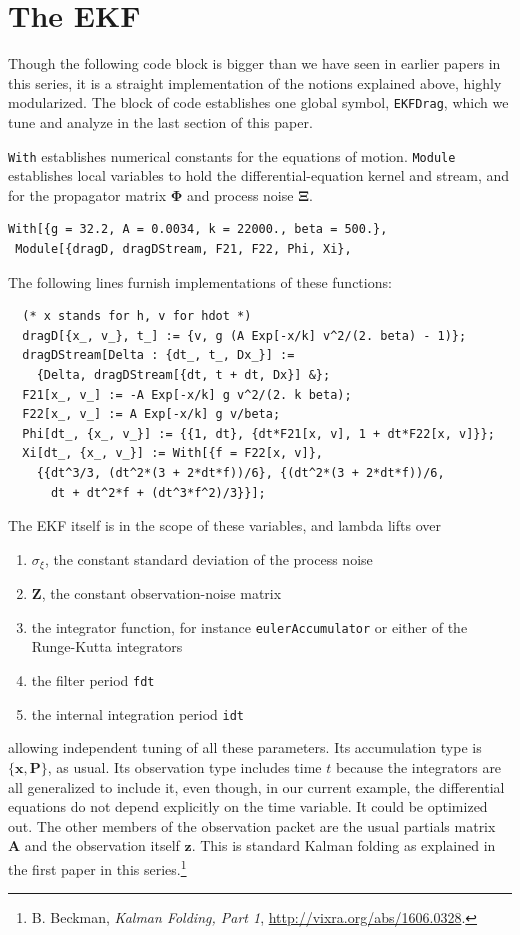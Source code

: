 \documentclass[10pt,oneside,x11names]{article}
\begin{document}
\section{The EKF}
\label{sec:orgheadline10}

Though the following code block is bigger than we have seen in earlier papers in
this series, it is a
straight implementation of the notions explained above, highly modularized. The
block of code establishes one global symbol, \texttt{EKFDrag}, which we tune and
analyze in the last section of this paper.

\texttt{With} establishes numerical constants for the equations of motion.
\texttt{Module} establishes local variables to hold the differential-equation kernel and
stream, and for the propagator matrix \(\mathbold{\Phi}\) and process noise
\(\mathbold{\Xi}\). 

\begin{verbatim}
With[{g = 32.2, A = 0.0034, k = 22000., beta = 500.},
 Module[{dragD, dragDStream, F21, F22, Phi, Xi},
\end{verbatim}

The following lines furnish implementations of these functions:

\begin{verbatim}
  (* x stands for h, v for hdot *)
  dragD[{x_, v_}, t_] := {v, g (A Exp[-x/k] v^2/(2. beta) - 1)};
  dragDStream[Delta : {dt_, t_, Dx_}] :=
    {Delta, dragDStream[{dt, t + dt, Dx}] &};
  F21[x_, v_] := -A Exp[-x/k] g v^2/(2. k beta);
  F22[x_, v_] := A Exp[-x/k] g v/beta;
  Phi[dt_, {x_, v_}] := {{1, dt}, {dt*F21[x, v], 1 + dt*F22[x, v]}};
  Xi[dt_, {x_, v_}] := With[{f = F22[x, v]},
    {{dt^3/3, (dt^2*(3 + 2*dt*f))/6}, {(dt^2*(3 + 2*dt*f))/6, 
      dt + dt^2*f + (dt^3*f^2)/3}}];
\end{verbatim}

The EKF itself is in the scope of these variables, and lambda lifts over 
\begin{enumerate}
\item \(\sigma_\xi\), the constant standard deviation of the process noise
\item \(\mathbold{Z}\), the constant observation-noise matrix
\item the integrator function, for instance \texttt{eulerAccumulator} or either of the
Runge-Kutta integrators
\item the filter period \texttt{fdt}
\item the internal integration period \texttt{idt}
\end{enumerate}
allowing independent tuning of all these parameters. Its accumulation type is
\(\{\mathbold{x},\mathbold{P}\}\), as usual. Its observation type includes time
\(t\) because the integrators are all generalized to include it, even though, in
our current example, the differential equations do not depend explicitly on the
time variable. It could be optimized out. The other members of the observation
packet are the usual partials matrix \(\mathbold{A}\) and the observation itself
\(\mathbold{z}\). This is standard Kalman folding as explained in the first paper
in this series.\footnote{B. Beckman, \emph{Kalman Folding, Part 1}, \url{http://vixra.org/abs/1606.0328}.}
\end{document}
